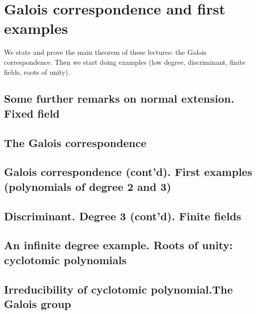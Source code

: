 \chapter{Galois correspondence and first examples}
We state and prove the main theorem of these lectures: the Galois
correspondence. Then we start doing examples (low degree,
discriminant, finite fields, roots of unity).


\section{Some further remarks on normal extension. Fixed field}
\section{The Galois correspondence}
\section{Galois correspondence (cont'd). First examples (polynomials
  of degree 2 and 3)} 
\section{Discriminant. Degree 3 (cont'd). Finite fields}
\section{An infinite degree example. Roots of unity: cyclotomic polynomials}
\section{Irreducibility of cyclotomic polynomial.The Galois group}
